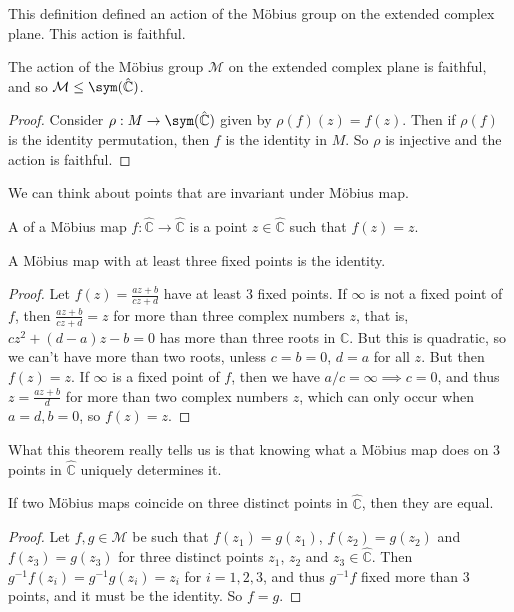 \documentclass[a4paper]{scrartcl}
\begin{document}
This definition defined an action of the Möbius group on the extended complex plane. This action is faithful.

\begin{proposition}
	The action of the Möbius group $\mathcal{M}$ on the extended complex plane is faithful, and so $\mathcal{M} \leq \sym(\hat{\mathbb{C}})$.
\end{proposition}
\begin{proof}
	Consider $\rho : M \rightarrow \sym(\hat{\mathbb{C}})$ given by $\rho(f)(z) = f(z)$. Then if $\rho(f)$ is the identity permutation, then $f$ is the identity in $M$. So $\rho$ is injective and the action is faithful.
\end{proof}

We can think about points that are invariant under Möbius map.

\begin{definition}
	A  of a Möbius map $f: \hat{\mathbb{C}} 	\rightarrow \hat{\mathbb{C}}$ is a point $z \in \hat{\mathbb{C}}$ such that $f(z) = z$.
\end{definition}

\begin{theorem}
	A Möbius map with at least three fixed points is the identity.
\end{theorem}
\begin{proof}
Let $f(z) = \frac{az + b}{cz + d}$ have at least 3 fixed points. If $\infty$ is not a fixed point of $f$, then $\frac{az + b}{cz + d} = z$ for more than three complex numbers $z$, that is, $cz^2 + (d - a)z - b = 0$ has more than three roots in $\mathbb{C}$. But this is quadratic, so we can't have more than two roots, unless $c = b = 0$, $d = a$ for all $z$. But then $f(z) = z$. If $\infty$ is a fixed point of $f$, then we have $a/c = \infty \implies c = 0$, and thus $z = \frac{az + b}{d}$ for more than two complex numbers $z$, which can only occur when $a = d, b = 0$, so $f(z) = z$.
\end{proof}

What this theorem really tells us is that knowing what a Möbius map does on 3 points in $\hat{\mathbb{C}}$ uniquely determines it.

\begin{corollary}
	If two Möbius maps coincide on three distinct points in $\hat{\mathbb{C}}$, then they are equal.
\end{corollary}
\begin{proof}
	Let $f, g \in \mathcal{M}$ be such that $f(z_1) = g(z_1)$, $f(z_2) = g(z_2)$ and $f(z_3) = g(z_3)$ for three distinct points $z_1$, $z_2$ and $z_3 \in \hat{\mathbb{C}}$. Then $g^{-1}f(z_i) = g^{-1} g(z_i) = z_i$ for $i = 1, 2, 3$, and thus $g^{-1}f$ fixed more than 3 points, and it must be the identity. So $f = g$.
\end{proof}
\end{document}
